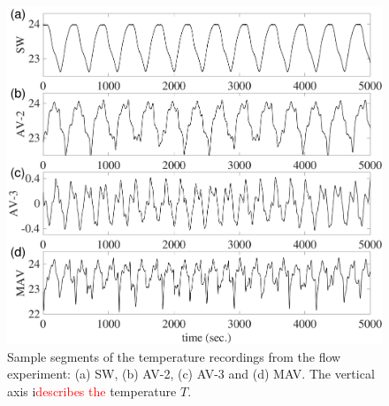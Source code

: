 \documentclass[aip,cha,reprint,nofootinbib]{revtex4-1}
\begin{document}
\begin{figure}
	\centering 
	\includegraphics[width=\columnwidth]{TS_fluid.pdf}
\caption{\small{Sample segments of the temperature recordings from the flow experiment: (a) SW, (b) AV-2, (c) AV-3 and (d) MAV. The vertical axis i\textcolor{red}{describes the} temperature $T$. } \label{tseriesFluid}}
\end{figure}
\end{document}
